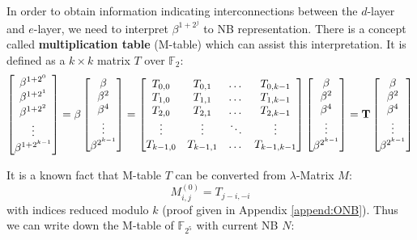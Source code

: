 \begin{Example}
In order to obtain information 
indicating interconnections between the $d$-layer and $e$-layer, we need to interpret $\beta^{1+2^j}$ 
to NB representation.
There is a concept called {\bf multiplication table} (M-table) which can assist this interpretation. It is defined as 
a $k\times k$ matrix $T$ over $\mathbb F_2$:
\begin{equation}
\label{eqn:multitable}
\begin{bmatrix}
\beta^{1+2^0} \\ \beta^{1+2^1} \\ \beta^{1+2^2} \\ \vdots \\ \beta^{1+2^{k-1}}
\end{bmatrix}
= \beta
\begin{bmatrix}
\beta \\ \beta^2 \\ \beta^4 \\ \vdots \\ \beta^{2^{k-1}}
\end{bmatrix}
=
\begin{bmatrix}
T_{0,0}      &   T_{0,1}        & \dots & T_{0,k-1}\\
T_{1,0}    &   T_{1,1}           & \dots & T_{1,k-1}\\
T_{2,0}    &   T_{2,1}           & \dots & T_{2,k-1}\\
\vdots & \vdots              & \ddots     & \vdots \\
T_{k-1,0}    &   T_{k-1,1}           & \dots & T_{k-1,k-1}
\end{bmatrix}
\begin{bmatrix}
\beta \\ \beta^2 \\ \beta^4 \\ \vdots \\ \beta^{2^{k-1}}
\end{bmatrix}
= {\bf T}
\begin{bmatrix}
\beta \\ \beta^2 \\ \beta^4 \\ \vdots \\ \beta^{2^{k-1}}
\end{bmatrix}
\end{equation}

It is a known fact that M-table $T$ can be converted from $\lambda$-Matrix $M$:
$$M_{i,j}^{(0)} = T_{j-i,-i}$$
with indices reduced modulo $k$ (proof given in Appendix \ref{append:ONB}). Thus we can write down the M-table of $\mathbb F_{2^5}$ with current NB $N$:


\end{Example}
